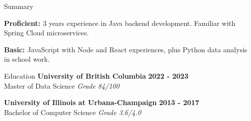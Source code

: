 \documentclass{resume} %
\begin{document}
\begin{skillSection}{Summary}
\item {\bf{Proficient: }}3 years experience in Java backend development. Familiar with Spring Cloud microservices.
\item {\bf{Basic: }}JavaScript with Node and React experiences, plus Python data analysis in school work.
\end{skillSection}

\begin{rSection}{Education}
{\bf University of British Columbia} \hfill {\bf 2022 - 2023}
\\ {Master of Data Science} \hfill {\em{Grade 84/100}}

{\bf University of Illinois at Urbana-Champaign} \hfill {\bf 2013 - 2017}
\\ {Bachelor of Computer Science} \hfill {\em{Grade 3.6/4.0}}
\end{rSection}
\end{document}
